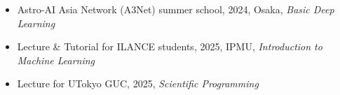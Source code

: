 \begin{itemize}
\item Astro-AI Asia Network (A3Net) summer school, 2024, Osaka, \emph{Basic Deep Learning} 
\item Lecture \& Tutorial for ILANCE students, 2025, IPMU, \emph{Introduction to Machine Learning}
\item Lecture for UTokyo GUC, 2025, \emph{Scientific Programming}
\end{itemize}
